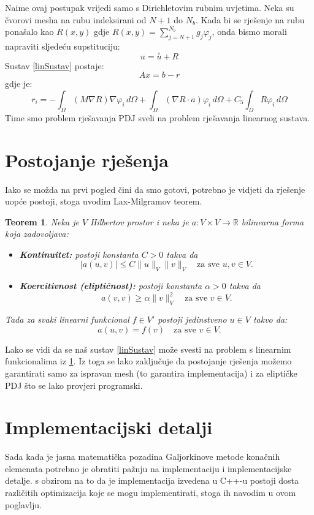 \documentclass[zavrsnirad]{../fer}
\newtheorem{teorem}{Teorem}
\begin{document}
Naime ovaj postupak vrijedi samo s Dirichletovim
rubnim uvjetima. Neka su čvorovi mesha na rubu indeksirani
od $N+1$ do $N_b$.
Kada bi se rješenje na rubu ponašalo kao
$R(x,y)$ gdje $R(x,y) = \sum_{j=N + 1}^{N_b} g_j \varphi_j$,
onda bismo morali napraviti sljedeću
supstituciju:
$$u = \overset{\circ}u + R$$
Sustav \ref{linSustav}
postaje:
$$Ax = b - r$$
gdje je:
$$r_i = - \int_{\Omega}(M\nabla R) \nabla \varphi_i \, d \Omega +
\int_{\Omega}(\nabla R \cdot a) \varphi_i \, d \Omega +
C_5 \int_{\Omega} R \varphi_i\, d\Omega
$$
Time smo problem rješavanja PDJ sveli na problem
rješavanja linearnog sustava.
\section{Postojanje rješenja}
\label{postojanje}
Iako se možda na prvi pogled čini da smo gotovi, potrebno 
je vidjeti da rješenje uopće postoji, stoga uvodim 
Lax-Milgramov teorem.
\begin{teorem}
  \label{laxMil}
Neka je $ V $ Hilbertov prostor i neka je $ a: V \times V \rightarrow \mathbb{R} $ bilinearna forma koja zadovoljava:
\begin{itemize}
    \item \textbf{Kontinuitet:} postoji konstanta $ C > 0 $ takva da
    $$
    |a(u, v)| \leq C \|u\|_V \|v\|_V \quad \text{za sve } u, v \in V.
    $$
    
    \item \textbf{Koercitivnost (eliptičnost):} postoji konstanta $ \alpha > 0 $ takva da
    $$
    a(v, v) \geq \alpha \|v\|_V^2 \quad \text{za sve } v \in V.
    $$
\end{itemize}

Tada za svaki linearni funkcional $ f \in V' $ postoji jedinstveno $ u \in V $ takvo da:
$$
a(u, v) = f(v) \quad \text{za sve } v \in V.
$$
\end{teorem}
Lako se vidi da se naš sustav \ref{linSustav} 
može svesti na problem s linearnim funkcionalima iz
\ref{laxMil}. Iz toga se lako zaključuje da
postojanje rješenja možemo garantirati samo za ispravan mesh
(to garantira implementacija) i za eliptičke PDJ što se lako provjeri programski.

\newpage
\section{Implementacijski detalji}
\label{implementacijaOpis}
Sada kada je jasna matematička pozadina 
Galjorkinove metode konačnih elemenata potrebno je 
obratiti pažnju na implementaciju i implementacijske detalje.
s obzirom na to da je implementacija izvedena u C++-u postoji
dosta različitih optimizacija koje se mogu implementirati,
stoga ih navodim u ovom poglavlju.
\end{document}
